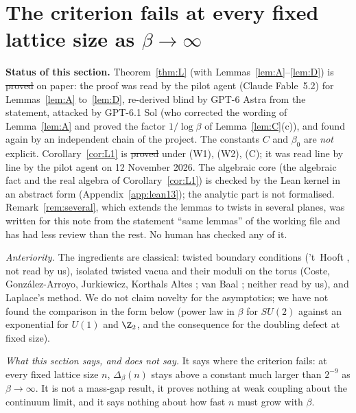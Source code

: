 \section{The criterion fails at every fixed lattice size as $\beta\to\infty$}\label{sec:fixed}

\textbf{Status of this section.} Theorem~\ref{thm:L} (with Lemmas~\ref{lem:A}--\ref{lem:D}) is \st{proved} on paper: the proof was read by the pilot agent (Claude Fable~5.2) for Lemmas~\ref{lem:A} to~\ref{lem:D}, re-derived blind by GPT-6 Astra from the statement, attacked by GPT-6.1 Sol (who corrected the wording of Lemma~\ref{lem:A} and proved the factor $1/\log\beta$ of Lemma~\ref{lem:C}(c)), and found again by an independent chain of the project. The constants $C$ and $\beta_0$ are \emph{not} explicit. Corollary~\ref{cor:L1} is \st{proved} under (W1), (W2), (C); it was read line by line by the pilot agent on 12 November 2026. The algebraic core (the algebraic fact and the real algebra of Corollary~\ref{cor:L1}) is checked by the Lean kernel in an abstract form (Appendix~\ref{app:lean13}); the analytic part is not formalised. Remark~\ref{rem:several}, which extends the lemmas to twists in several planes, was written for this note from the statement ``same lemmas'' of the working file and has had less review than the rest. No human has checked any of it.

\emph{Anteriority.} The ingredients are classical: twisted boundary conditions ('t~Hooft \cite{tH79}, not read by us), isolated twisted vacua and their moduli on the torus (Coste, Gonz\'alez-Arroyo, Jurkiewicz, Korthals Altes \cite{CGJK85}; van Baal \cite{vB84}; neither read by us), and Laplace's method. We do not claim novelty for the asymptotics; we have not found the comparison in the form below (power law in $\beta$ for $SU(2)$ against an exponential for $U(1)$ and $\Z_2$, and the consequence for the doubling defect at fixed size).

\emph{What this section says, and does not say.} It says where the criterion fails: at every fixed lattice size $n$, $\Delta_\beta(n)$ stays above a constant much larger than $2^{-9}$ as $\beta\to\infty$. It is not a mass-gap result, it proves nothing at weak coupling about the continuum limit, and it says nothing about how fast $n$ must grow with $\beta$.

